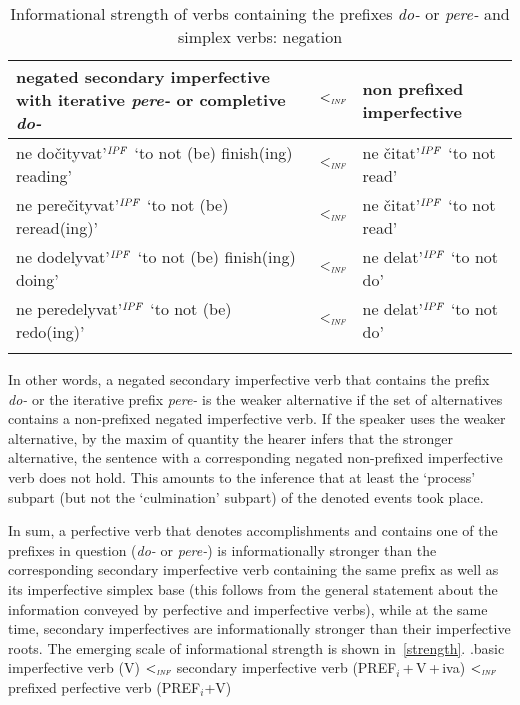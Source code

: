 \begin{table}
\caption{Informational strength of verbs containing the prefixes \textit{do-} or \textit{pere-} and simplex verbs: negation\label{table:neg}}
\begin{tabularx}{\textwidth}{Qcl}
\lsptoprule
negated secondary imperfective with iterative \textit{pere-} or completive \textit{do-} & $<_{\textit{\tiny INF}}$ & non prefixed imperfective\\
\midrule
ne do\v{c}ityvat'$^{\mathit{IPF}}$ `to not (be) finish(ing) reading' & $<_{\textit{\tiny INF}}$ & ne \v{c}itat'$^{\mathit{IPF}}$ `to not read'\\
ne pere\v{c}ityvat'$^{\mathit{IPF}}$ `to not (be) reread(ing)' & $<_{\textit{\tiny INF}}$ & ne \v{c}itat'$^{\mathit{IPF}}$ `to not read'\\
ne dodelyvat'$^{\mathit{IPF}}$ `to not (be) finish(ing) doing' & $<_{\textit{\tiny INF}}$ & ne delat'$^{\mathit{IPF}}$ `to not do'\\
ne peredelyvat'$^{\mathit{IPF}}$ `to not (be) redo(ing)' & $<_{\textit{\tiny INF}}$ & ne delat'$^{\mathit{IPF}}$ `to not do'\\
\lspbottomrule
\end{tabularx}
\end{table}

In other words, a negated secondary imperfective verb that contains the prefix \textit{do-} or the iterative prefix \textit{pere-} is the weaker alternative if the set of alternatives contains a non-prefixed negated imperfective verb. If the speaker uses the weaker alternative, by the maxim of quantity \citep{Grice:75} the hearer infers that the stronger alternative, the sentence with a corresponding negated non-prefixed imperfective verb does not hold. This amounts to the inference that at least the `process' subpart (but not the `culmination' subpart) of the denoted events took place.

In sum, a perfective verb that denotes accomplishments and contains one of the prefixes in question (\textit{do-} or \textit{pere-}) is informationally stronger than the corresponding secondary imperfective verb containing the same prefix as well as its imperfective simplex base (this follows from the general statement about the information conveyed by perfective and imperfective verbs), while at the same time, secondary imperfectives are informationally stronger than their imperfective roots. The emerging scale of informational strength is shown in~\ref{strength}.
\ex.\label{strength}basic imperfective verb (V) $<_{\textit{\tiny INF}}$ secondary imperfective verb (PREF$_i$\,+\,V\,+\,iva) $<_{\textit{\tiny INF}}$ prefixed perfective verb (PREF$_i$+V)

